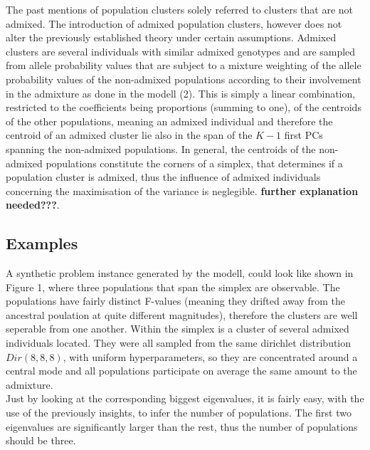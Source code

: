 \documentclass[a4paper, 11pt]{article}
\begin{document}
The past mentions of population clusters solely referred to clusters that are not admixed. The introduction of admixed population clusters, however does not alter the previously established theory under certain assumptions. Admixed clusters are several individuals with similar admixed genotypes and are sampled from allele probability values that are subject to a mixture weighting of the allele probability values of the non-admixed populations according to their involvement in the admixture as done in the modell (2). This is simply a linear combination, restricted to the coefficients being proportions (summing to one), of the centroids of the other populations, meaning an admixed individual and therefore the centroid of an admixed cluster lie also in the span of the $K-1$ first PCs spanning the non-admixed populations. In general, the centroids of the non-admixed populations constitute the corners of a simplex, that determines if a population cluster is admixed, thus the influence of admixed individuals concerning the maximisation of the variance is neglegible. \textbf{further explanation needed???}.

\subsection{Examples}
A synthetic problem instance generated by the modell, could look like shown in Figure 1, where three populations that span the simplex are observable. The populations have fairly distinct F-values (meaning they drifted away from the ancestral poulation at quite different magnitudes), therefore the clusters are well seperable from one another. Within the simplex is a cluster of several admixed individuals located. They were all sampled from the same dirichlet distribution $Dir(8, 8, 8)$, with uniform hyperparameters, so they are concentrated around a central mode and all populations participate on average the same amount to the admixture. \\
Just by looking at the corresponding biggest eigenvalues, it is fairly easy, with the use of the previously insights, to infer the number of populations. The first two eigenvalues are significantly larger than the rest, thus the number of populations should be three. 
\end{document}
